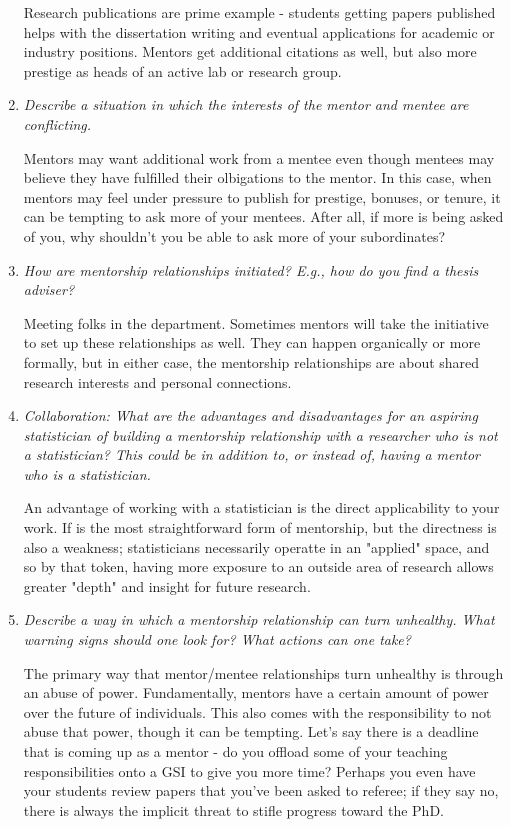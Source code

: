 \documentclass[12pt]{article}
\begin{document}
\begin{enumerate}
Research publications are prime example - students getting papers published helps with the dissertation writing
and eventual applications for academic or industry positions. Mentors get additional citations as well, but also
more prestige as heads of an active lab or research group.

\item \textit{Describe a situation in which the interests of the mentor and mentee are conflicting. }

Mentors may want additional work from a mentee even though mentees may believe they have fulfilled
their olbigations to the mentor. In this case, when mentors may feel under pressure to publish
for prestige, bonuses, or tenure, it can be tempting to ask more of your mentees. After all, if
more is being asked of you, why shouldn't you be able to ask more of your subordinates?

\item \textit{How are mentorship relationships initiated? E.g., how do you find a thesis adviser?}

Meeting folks in the department. Sometimes mentors will take the initiative to set up these
relationships as well. They can happen organically or more formally, but in either case, 
the mentorship relationships are about shared research interests and personal connections.

\item \textit{Collaboration: What are the advantages and disadvantages for an aspiring statistician of building a mentorship relationship with a researcher who is not a statistician? This could be in addition to, or instead of, having a mentor who is a statistician.}

An advantage of working with a statistician is the direct applicability to your work. If is the most straightforward
form of mentorship, but the directness is also a weakness; statisticians necessarily operatte in an "applied" space,
and so by that token, having more exposure to an outside area of research allows greater "depth" and insight
for future research.

\item \textit{Describe a way in which a mentorship relationship can turn unhealthy. What warning signs should one look for? What actions can one take?}

The primary way that mentor/mentee relationships turn unhealthy is through an abuse of power. Fundamentally, mentors
have a certain amount of power over the future of individuals. This also comes with the responsibility to not abuse
that power, though it can be tempting. Let's say there is a deadline that is coming up as a mentor - do you offload
some of your teaching responsibilities onto a GSI to give you more time? Perhaps you even have your students review
papers that you've been asked to referee; if they say no, there is always the implicit threat to stifle progress toward
the PhD. 


\end{enumerate}
\end{document}
